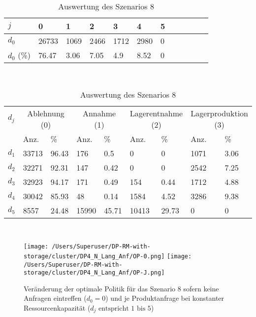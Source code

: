 \begin{table}[h!]
\renewcommand{\arraystretch}{1.5}
  \begin{center}
    \caption{Auswertung des Szenarios 8}  \label{AS8}
    \vspace*{3mm}
    \begin{tabular}{l l l l l l l l l l l l }  \hline 
         $j$ & 0 & 1  & 2 & 3 & 4  & 5   \\  \hline
$d_{0}$ &  26733 &  1069 &  2466 &  1712 &  2980 &  0 \\
$d_{0}$ (\%) &  76.47 &  3.06 &  7.05 &   4.9 &  8.52 &  0 \\
\hline
    \end{tabular} \\[3mm]
        \begin{tabular}{ l l l l l l l l l}   \hline    %
    $d_j$ & \multicolumn{2}{c}{Ablehnung (0)} & \multicolumn{2}{c}{Annahme (1)}  & \multicolumn{2}{c}{Lagerentnahme (2)} & \multicolumn{2}{c}{Lagerproduktion (3)}\\
    & Anz. & \% & Anz. & \% & Anz. & \% & Anz. & \% \\ \hline 
$d_{1}$ &  33713 &  96.43 &    176 &    0.5 &    0 &    0 &  1071 &  3.06 \\
$d_{2}$ &  32271 &  92.31 &    147 &   0.42 &    0 &    0 &  2542 &  7.25 \\
$d_{3}$ &  32923 &  94.17 &    171 &   0.49 &    154 &   0.44 &  1712 &  4.88 \\
$d_{4}$ &  30042 &  85.93 &     48 &   0.14 &   1584 &   4.52 &  3286 &  9.38 \\
$d_{5}$ &   8557 &  24.48 &  15990 &  45.71 &  10413 &  29.73 &   0 &   0 \\
          \hline
   \end{tabular} \\[3mm]
     \end{center}
\end{table}

\begin{figure}[h!]     
\begin{center}
\texttt{[image: /Users/Superuser/DP-RM-with-storage/cluster/DP4\_N\_Lang\_Anf/OP-0.png]}
\texttt{[image: /Users/Superuser/DP-RM-with-storage/cluster/DP4\_N\_Lang\_Anf/OP-J.png]}
    \caption{Veränderung der optimale Politik für das Szenario 8 sofern keine Anfragen eintreffen ($d_0=0$) und je Produktanfrage bei konstanter Ressourcenkapazität ($d_j\text{ entspricht }1\text{ bis }5$)}  \label{SV8}
  \end{center}
\end{figure}

